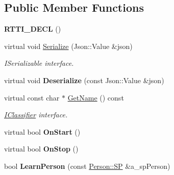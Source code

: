\subsection*{Public Member Functions}
\begin{DoxyCompactItemize}
\item 
\mbox{\label{class_face_classifier_ac8f91bc48109bf3c5f9f62ce4dfff6d1}} 
{\bfseries R\+T\+T\+I\+\_\+\+D\+E\+CL} ()
\item 
\mbox{\label{class_face_classifier_a7a88b6d79f427a05540e0f6b00b70ab4}} 
virtual void \hyperlink{class_face_classifier_a7a88b6d79f427a05540e0f6b00b70ab4}{Serialize} (Json\+::\+Value \&json)
\begin{DoxyCompactList}\small\item\em I\+Serializable interface. \end{DoxyCompactList}\item 
\mbox{\label{class_face_classifier_af7b0a56809bb07fa4c96a0a4640fd4b0}} 
virtual void {\bfseries Deserialize} (const Json\+::\+Value \&json)
\item 
\mbox{\label{class_face_classifier_a5efcd3a958a7c00a6afabd864fe1bc66}} 
virtual const char $\ast$ \hyperlink{class_face_classifier_a5efcd3a958a7c00a6afabd864fe1bc66}{Get\+Name} () const
\begin{DoxyCompactList}\small\item\em \hyperlink{class_i_classifier}{I\+Classifier} interface. \end{DoxyCompactList}\item 
\mbox{\label{class_face_classifier_a63467935351f6e31ffb297509a1ef2ce}} 
virtual bool {\bfseries On\+Start} ()
\item 
\mbox{\label{class_face_classifier_a8e3d1e7c0607b8530ca7042540a72894}} 
virtual bool {\bfseries On\+Stop} ()
\item 
\mbox{\label{class_face_classifier_a7d9ee408b95543317637c8070dbf73be}} 
bool {\bfseries Learn\+Person} (const \hyperlink{class_person_a16426d961e9ca63d2524812444163d36}{Person\+::\+SP} \&a\+\_\+sp\+Person)
\end{DoxyCompactItemize}
